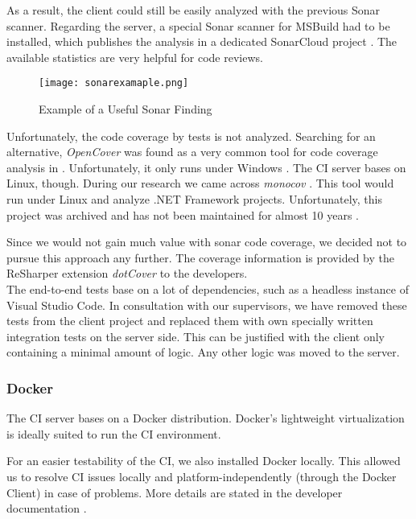 As a result, the client could still be easily analyzed with the previous Sonar scanner.
Regarding the server, a special Sonar scanner for MSBuild had to be installed, which publishes the analysis in a dedicated SonarCloud project \cite{dev}.
The available statistics are very helpful for code reviews.\\



\begin{figure}[H]
    \centering
    \texttt{[image: sonarexamaple.png]}
    \caption{Example of a Useful Sonar Finding}
    \label{fig:sonarexample}
\end{figure}


Unfortunately, the code coverage by tests is not analyzed.
Searching for an alternative, \textit{OpenCover} was found as a very common tool for code coverage analysis in \Csharp.
Unfortunately, it only runs under Windows  \cite{opencover}.
The CI server bases on Linux, though.
During our research we came across \textit{monocov} \cite{monocov}.
This tool would run under Linux and analyze .NET Framework projects.
Unfortunately, this project was archived and has not been maintained for almost 10 years \cite{monocov}.

Since we would not gain much value with sonar code coverage, we decided not to pursue this approach any further.
The coverage information is provided by the ReSharper extension \textit{dotCover} \cite{dotcover} to the developers.\\

The end-to-end tests base on a lot of dependencies, such as a headless instance of Visual Studio Code.
In consultation with our supervisors, we have removed these tests from the client project and replaced them with own specially written integration tests on the server side.
This can be justified with the client only containing a minimal amount of logic.
Any other logic was moved to the server.

\subsubsection{Docker}
The CI server bases on a Docker distribution.
Docker's lightweight virtualization is ideally suited to run the CI environment.

For an easier testability of the CI, we also installed Docker locally.
This allowed us to resolve CI issues locally and platform-independently (through the Docker Client) in case of problems.
More details are stated in the developer documentation \cite{dev}.\\

